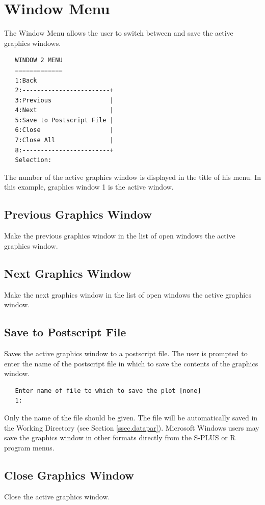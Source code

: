 \documentclass[12pt,letterpaper]{report}
\begin{document}
\chapter{Window Menu}
\noindent
The Window Menu allows the user to switch between and save the active graphics
windows.
\vskip 9pt
\begin{tiny}
\begin{verbatim}
   WINDOW 2 MENU
   =============
   1:Back
   2:------------------------+
   3:Previous                |
   4:Next                    |
   5:Save to Postscript File |
   6:Close                   |
   7:Close All               |
   8:------------------------+
   Selection:
\end{verbatim}
\end{tiny}
The number of the active graphics window is displayed in the title of his menu.
In this example, graphics window 1 is the active window.

\section{Previous Graphics Window}
\noindent
Make the previous graphics window in the list of open windows the active
graphics window.

\section{Next Graphics Window}
\noindent
Make the next graphics window in the list of open windows the
active graphics window.

\section{Save to Postscript File}
\noindent
Saves the active graphics window to a postscript file. The user is prompted to
enter the name of the postscript file in which to save the contents of the
graphics window.
\vskip 9pt
\begin{tiny}
\begin{verbatim}
   Enter name of file to which to save the plot [none]
   1:
\end{verbatim}
\end{tiny}
Only the name of the file should be given. The file will be automatically saved
in the Working Directory (see Section \ref{ssec.datapar}). Microsoft Windows
users may save the graphics window in other formats directly from the S-PLUS or
R program menus.

\section{Close Graphics Window}
\noindent
Close the active graphics window.
\end{document}
